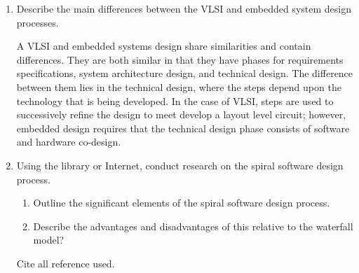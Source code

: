 \begin{enumerate}
  
\item
  Describe the main differences between the VLSI and embedded system
  design processes.\\
\begin{solution}{A}{
  VLSI and embedded systems design share similarities and contain
differences. They are both similar in that they have phases for
requirements specifications, system architecture design, and technical
design. The difference between them lies in the technical design, where
the steps depend upon the technology that is being developed. In the
case of VLSI, steps are used to successively refine the design to meet
develop a layout level circuit; however, embedded design requires that
the technical design phase consists of software and hardware co-design.}
\end{solution}

\item
Using the library or Internet, conduct research on the spiral software design process.  
\begin{enumerate}
\item Outline the significant elements of the spiral software design process.  
\item Describe the advantages and disadvantages of this relative to the waterfall model? 
\end{enumerate}
Cite all reference used.
  

\end{enumerate}
